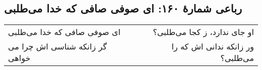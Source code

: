 \begin{center}
\section*{رباعی شمارهٔ ۱۶۰: ای صوفی صافی که خدا می‌طلبی}
\label{sec:160}
\begin{longtable}{l p{0.5cm} r}
ای صوفی صافی که خدا می‌طلبی
&&
او جای ندارد، ز کجا می‌طلبی؟
\\
گر زانکه شناسی اش چرا می خواهی
&&
ور زانکه ندانی اش که را می‌طلبی؟
\\
\end{longtable}
\end{center}
